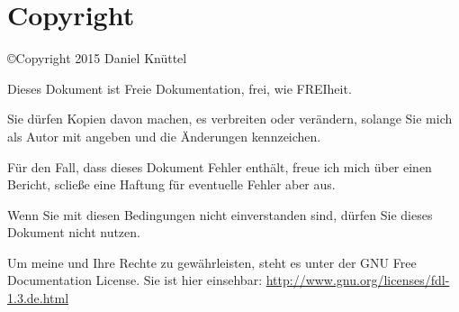 \documentclass[a4paper,12pt,oneside]{scrreprt}
\begin{document}
\part{Copyright}

\copyright Copyright 2015 Daniel Knüttel

Dieses Dokument ist Freie Dokumentation, frei, wie FREIheit.

Sie dürfen Kopien davon machen, es verbreiten oder verändern, solange Sie mich als Autor mit angeben und die Änderungen kennzeichen.

Für den Fall, dass dieses Dokument Fehler enthält, freue ich mich über einen Bericht, scließe eine Haftung für eventuelle Fehler aber aus.

Wenn Sie mit diesen Bedingungen nicht einverstanden sind, dürfen Sie dieses Dokument nicht nutzen.

Um meine und Ihre Rechte zu gewährleisten, steht es unter der GNU Free Documentation License. Sie ist hier einsehbar: \url{http://www.gnu.org/licenses/fdl-1.3.de.html}
\end{document}
